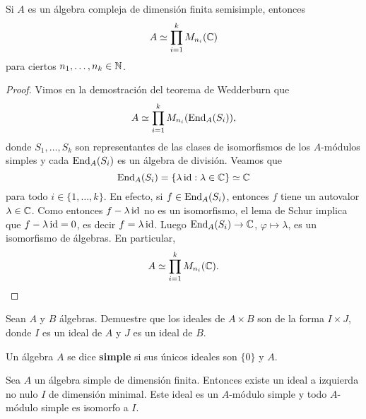\begin{corollary}[Mollien]
	Si $A$ es un álgebra compleja de dimensión finita semisimple, entonces
	\[
	A\simeq\prod_{i=1}^k M_{n_i}(\mathbb{C})
	\]  
	para ciertos $n_1,\dots,n_k\in\mathbb{N}$. 
\end{corollary}

\begin{proof}
	Vimos en la demostración del teorema de Wedderburn que 
	\[
	A\simeq \prod_{i=1}^k M_{n_i}(\operatorname{End}_A(S_i)),
	\]
	donde $S_1,\dots,S_k$ son representantes de las clases de 
	isomorfismos de los $A$-módulos simples y cada $\operatorname{End}_A(S_i)$ es un álgebra de división. 
	Veamos que 
	\[
	\operatorname{End}_A(S_i)=\{\lambda\operatorname{id}:\lambda\in\mathbb{C}\}\simeq\mathbb{C}
	\]
	para todo $i\in\{1,\dots,k\}$. En efecto, si 
	$f\in\operatorname{End}_A(S_i)$, entonces $f$ tiene un autovalor $\lambda\in\mathbb{C}$. Como entonces 
	$f-\lambda\operatorname{id}$ no es un isomorfismo, el lema de Schur implica que $f-\lambda\operatorname{id}=0$, 
	es decir $f=\lambda\operatorname{id}$. Luego $\operatorname{End}_A(S_i)\to\mathbb{C}$, $\varphi\mapsto\lambda$, 
	es un isomorfismo de álgebras. En particular, 
	\[
	A\simeq \prod_{i=1}^k M_{n_i}(\mathbb{C}).\qedhere
	\]
\end{proof}

\begin{exercise}
Sean $A$ y $B$ álgebras. Demuestre que los ideales de $A\times B$ son 
de la forma $I\times J$, donde $I$ es un ideal de $A$ y $J$ es un ideal de $B$. 
\end{exercise}

\begin{definition}
Un álgebra $A$ se dice \textbf{simple} si sus únicos ideales son $\{0\}$ y $A$. 
\end{definition}

%

\begin{proposition}
	Sea $A$ un álgebra simple de dimensión finita. Entonces existe un ideal a
	izquierda no nulo $I$ de dimensión minimal.  Este ideal es un $A$-módulo
	simple y todo $A$-módulo simple es isomorfo a $I$. 	
\end{proposition}

